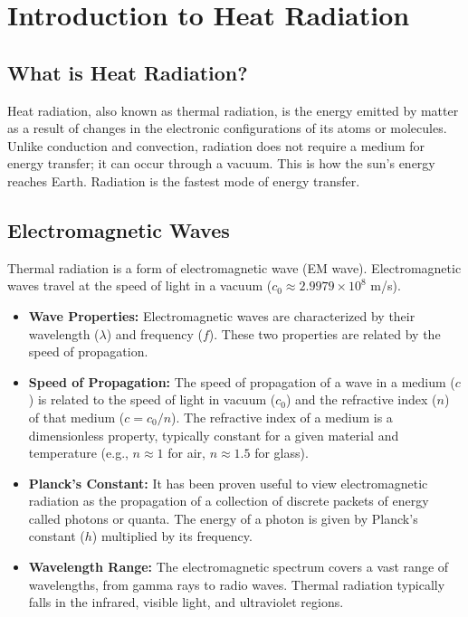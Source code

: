 \section{Introduction to Heat Radiation}

\subsection{What is Heat Radiation?}
Heat radiation, also known as thermal radiation, is the energy emitted by matter as a result of changes in the electronic configurations of its atoms or molecules. Unlike conduction and convection, radiation does not require a medium for energy transfer; it can occur through a vacuum. This is how the sun's energy reaches Earth. Radiation is the fastest mode of energy transfer.

\subsection{Electromagnetic Waves}
Thermal radiation is a form of electromagnetic wave (EM wave). Electromagnetic waves travel at the speed of light in a vacuum ($c_0 \approx 2.9979 \times 10^8$ m/s).
\begin{itemize}
    \item \textbf{Wave Properties:} Electromagnetic waves are characterized by their wavelength ($\lambda$) and frequency ($f$). These two properties are related by the speed of propagation.
    \item \textbf{Speed of Propagation:} The speed of propagation of a wave in a medium ($c$) is related to the speed of light in vacuum ($c_0$) and the refractive index ($n$) of that medium ($c = c_0/n$). The refractive index of a medium is a dimensionless property, typically constant for a given material and temperature (e.g., $n \approx 1$ for air, $n \approx 1.5$ for glass).
    \item \textbf{Planck's Constant:} It has been proven useful to view electromagnetic radiation as the propagation of a collection of discrete packets of energy called photons or quanta. The energy of a photon is given by Planck's constant ($h$) multiplied by its frequency.
    \item \textbf{Wavelength Range:} The electromagnetic spectrum covers a vast range of wavelengths, from gamma rays to radio waves. Thermal radiation typically falls in the infrared, visible light, and ultraviolet regions.
\end{itemize}

